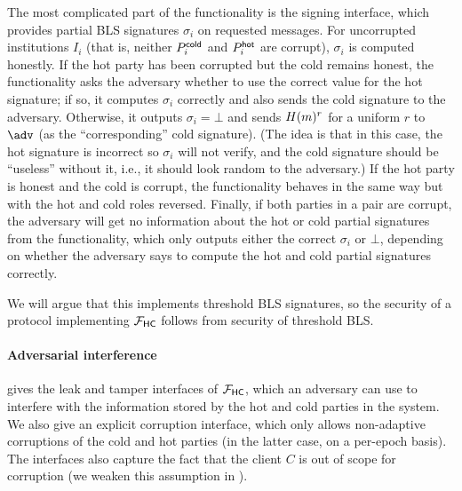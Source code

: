 % 

The most complicated part of the functionality is the signing interface, which provides partial BLS signatures $\sigma_i$ on requested messages. For uncorrupted institutions $I_i$ (that is, neither $P_i^{\mathsf{cold}}$ and $P_i^{\mathsf{hot}}$ are corrupt), $\sigma_i$ is computed honestly.
If the hot party has been corrupted but the cold remains honest, the functionality asks the adversary whether to use the correct value for the hot signature; if so, it computes $\sigma_i$ correctly and also sends the cold signature to the adversary. Otherwise, it outputs $\sigma_i = \bot$ and sends $H(m)^r$ for a uniform $r$ to $\adv$ (as the ``corresponding'' cold signature). (The idea is that in this case, the hot signature is incorrect so $\sigma_i$ will not verify, and the cold signature should be ``useless'' without it, i.e., it should look random to the adversary.) 
If the hot party is honest and the cold is corrupt, the functionality behaves in the same way but with the hot and cold roles reversed. 
Finally, if both parties in a pair are corrupt, the adversary will get no information about the hot or cold partial signatures from the functionality, which only outputs either the correct $\sigma_i$ or $\bot$, depending on whether the adversary says to compute the hot and cold partial signatures correctly.

We will argue that this implements threshold BLS signatures, so the security of a protocol implementing $\mathcal{F}_\mathsf{HC}$ follows from security of threshold BLS.

\paragraph{Adversarial interference}  gives the leak and tamper interfaces of $\mathcal{F}_\mathsf{HC}$, which an adversary can use to interfere with the information stored by the hot and cold parties in the system.
We also give an explicit corruption interface, which only allows non-adaptive corruptions of the cold and hot parties (in the latter case, on a per-epoch basis). The interfaces also capture the fact that the client $C$ is out of scope for corruption (we weaken this assumption in ). 




